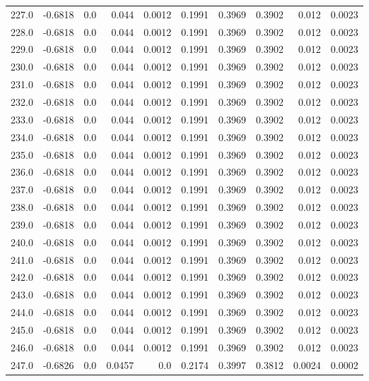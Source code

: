 \begin{longtable}{lrrrrrrrrr}
227.0 & -0.6818 & 0.0 & 0.044 & 0.0012 & 0.1991 & 0.3969 & 0.3902 & 0.012 & 0.0023 \\
228.0 & -0.6818 & 0.0 & 0.044 & 0.0012 & 0.1991 & 0.3969 & 0.3902 & 0.012 & 0.0023 \\
229.0 & -0.6818 & 0.0 & 0.044 & 0.0012 & 0.1991 & 0.3969 & 0.3902 & 0.012 & 0.0023 \\
230.0 & -0.6818 & 0.0 & 0.044 & 0.0012 & 0.1991 & 0.3969 & 0.3902 & 0.012 & 0.0023 \\
231.0 & -0.6818 & 0.0 & 0.044 & 0.0012 & 0.1991 & 0.3969 & 0.3902 & 0.012 & 0.0023 \\
232.0 & -0.6818 & 0.0 & 0.044 & 0.0012 & 0.1991 & 0.3969 & 0.3902 & 0.012 & 0.0023 \\
233.0 & -0.6818 & 0.0 & 0.044 & 0.0012 & 0.1991 & 0.3969 & 0.3902 & 0.012 & 0.0023 \\
234.0 & -0.6818 & 0.0 & 0.044 & 0.0012 & 0.1991 & 0.3969 & 0.3902 & 0.012 & 0.0023 \\
235.0 & -0.6818 & 0.0 & 0.044 & 0.0012 & 0.1991 & 0.3969 & 0.3902 & 0.012 & 0.0023 \\
236.0 & -0.6818 & 0.0 & 0.044 & 0.0012 & 0.1991 & 0.3969 & 0.3902 & 0.012 & 0.0023 \\
237.0 & -0.6818 & 0.0 & 0.044 & 0.0012 & 0.1991 & 0.3969 & 0.3902 & 0.012 & 0.0023 \\
238.0 & -0.6818 & 0.0 & 0.044 & 0.0012 & 0.1991 & 0.3969 & 0.3902 & 0.012 & 0.0023 \\
239.0 & -0.6818 & 0.0 & 0.044 & 0.0012 & 0.1991 & 0.3969 & 0.3902 & 0.012 & 0.0023 \\
240.0 & -0.6818 & 0.0 & 0.044 & 0.0012 & 0.1991 & 0.3969 & 0.3902 & 0.012 & 0.0023 \\
241.0 & -0.6818 & 0.0 & 0.044 & 0.0012 & 0.1991 & 0.3969 & 0.3902 & 0.012 & 0.0023 \\
242.0 & -0.6818 & 0.0 & 0.044 & 0.0012 & 0.1991 & 0.3969 & 0.3902 & 0.012 & 0.0023 \\
243.0 & -0.6818 & 0.0 & 0.044 & 0.0012 & 0.1991 & 0.3969 & 0.3902 & 0.012 & 0.0023 \\
244.0 & -0.6818 & 0.0 & 0.044 & 0.0012 & 0.1991 & 0.3969 & 0.3902 & 0.012 & 0.0023 \\
245.0 & -0.6818 & 0.0 & 0.044 & 0.0012 & 0.1991 & 0.3969 & 0.3902 & 0.012 & 0.0023 \\
246.0 & -0.6818 & 0.0 & 0.044 & 0.0012 & 0.1991 & 0.3969 & 0.3902 & 0.012 & 0.0023 \\
247.0 & -0.6826 & 0.0 & 0.0457 & 0.0 & 0.2174 & 0.3997 & 0.3812 & 0.0024 & 0.0002 \\

\end{longtable}
